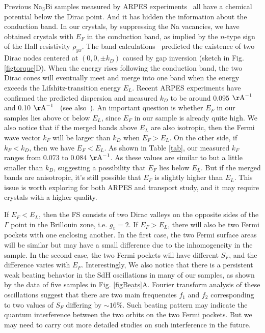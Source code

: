 Previous Na$_3$Bi samples measured by ARPES experiments~\cite{Liu2014a, Xu2015, Xu2013} all have a chemical potential below the Dirac point. And it has hidden the information about the conduction band. In our crystals, by suppressing the Na vacancies, we have obtained crystals with $E_F$ in the conduction band, as implied by the $n$-type sign of the Hall resistivity $\rho_{yx}$. The band calculations~\cite{Wang2012} predicted the existence of two Dirac nodes centered at $(0,0,\pm k_D)$ caused by gap inversion (sketch in Fig. \ref{figtorque}D). When the energy rises following the conduction band, the two Dirac cones will eventually meet and merge into one band when the energy exceeds the Lifshitz-transition energy $E_L$. Recent ARPES experiments have confirmed the predicted dispersion and measured $k_D$ to be around 0.095 $\rm{\AA}^{-1}$~\cite{Liu2014a} and 0.10 $\rm{\AA}^{-1}$~\cite{Xu2013} (see also~\cite{Zhang2014}). An important question is whether $E_F$ in our samples lies above or below $E_L$, since $E_F$ in our sample is already quite high. We also notice that if the merged bands above $E_L$ are also isotropic, then the Fermi wave vector $k_F$ will be larger than $k_D$ when $E_F > E_L$. On the other side, if $k_F < k_D$, then we have  $E_F < E_L$. As shown in Table \ref{tab}, our measured $k_F$ ranges from 0.073 to 0.084 $\rm{\AA}^{-1}$. As these values are similar to but a little smaller than $k_D$, suggesting a possibility that $E_F$ lies below $E_L$. But if the merged bands are anisotropic, it's still possible that $E_F$ is slightly higher than $E_L$. This issue is worth exploring for both ARPES and transport study, and it may require crystals with a higher quality.

If $E_F < E_L$, then the FS consists of two Dirac valleys on the opposite sides of the $\Gamma$ point in the Brillouin zone, i.e. $g_v = 2$. If $E_F > E_L$, there will also be two Fermi pockets with one enclosing another. In the first case, the two Fermi surface areas will be similar but may have a small difference due to the inhomogeneity in the sample. In the second case, the two Fermi pockets will have different $S_F$, and the difference varies with $E_F$. Interestingly, We also notice that there is a persistent weak beating behavior in the SdH oscillations in many of our samples, as shown by the data of five samples in Fig. \ref{figBeats}A. Fourier transform analysis of these oscillations suggest that there are two main frequencies $f_1$ and $f_2$ corresponding to two values of $S_F$ differing by $\sim 16\%$. Such beating pattern may indicate the quantum interference between the two orbits on the two Fermi pockets. But we may need to carry out more detailed studies on such interference in the future.

